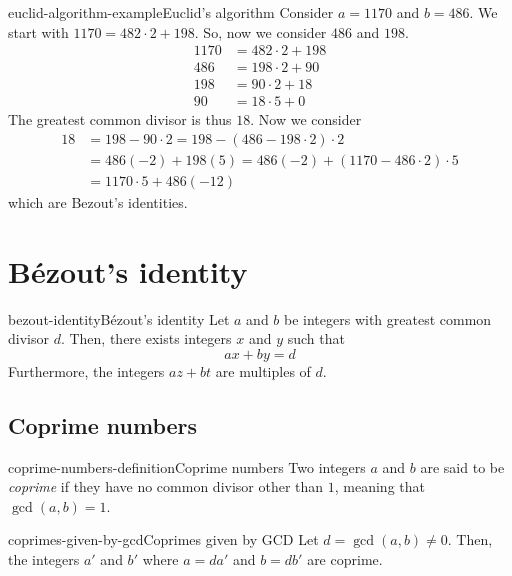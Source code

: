 \documentclass[preview]{standalone}
\begin{document}
\begin{snippetexample}{euclid-algorithm-example}{Euclid's algorithm}
    Consider \(a=1170\) and \(b=486\).
    We start with
    \(1170 = 482 \cdot 2 + 198\). So, now we consider \(486\) and \(198\).
    \begin{align*}
        1170 &= 482 \cdot 2 + 198 \\
        486 &= 198 \cdot 2 + 90 \\
        198 &= 90 \cdot 2 + 18 \\
        90 &= 18 \cdot 5 + 0
    \end{align*}
    The greatest common divisor is thus \(18\).
    Now we consider
    \begin{align*}
        18 &= 198 - 90\cdot 2 = 198 - (486 - 198 \cdot 2)\cdot 2 \\
        &= 486(-2) + 198(5) = 486(-2) + (1170 - 486\cdot 2) \cdot 5 \\
        &= 1170 \cdot 5 + 486(-12)
    \end{align*}
    which are Bezout's identities.
\end{snippetexample}

\section{Bézout's identity}

\begin{snippettheorem}{bezout-identity}{Bézout's identity}
    Let \(a\) and \(b\) be integers with greatest common divisor \(d\).
    Then, there exists integers \(x\) and \(y\) such that
    \[
        ax+by=d
    \]
    Furthermore, the integers \(az+bt\) are multiples of \(d\).
\end{snippettheorem}


\subsection{Coprime numbers}

\begin{snippetdefinition}{coprime-numbers-definition}{Coprime numbers}
    Two integers \(a\) and \(b\) are said to be \textit{coprime}
    if they have no common divisor other than \(1\), meaning that \(\gcd(a,b)=1\).
\end{snippetdefinition}

\begin{snippetproposition}{coprimes-given-by-gcd}{Coprimes given by GCD}
    Let \(d = \gcd(a, b) \neq 0\). Then, the integers \(a'\) and \(b'\) where \(a = da'\) and \(b = db'\)
    are coprime.
\end{snippetproposition}
\end{document}
